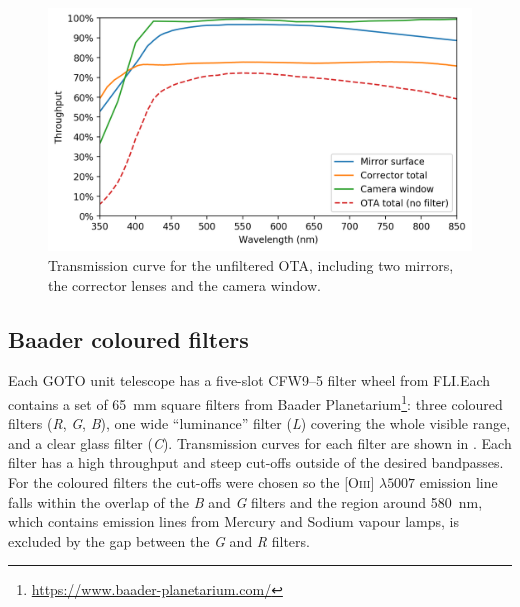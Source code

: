 \begin{colsection}
\begin{colsection}
\begin{figure}[t]
    \begin{center}
        \includegraphics[width=\textwidth]{images/throughput/trans_ota.png}
    \end{center}
    \caption[Combined OTA transmission curve]{
        Transmission curve for the unfiltered OTA, including two mirrors, the corrector lenses and the camera window.
    }\label{fig:trans_ota}
\end{figure}

\end{colsection}

\newpage
\subsection{Baader coloured filters}
\label{sec:filters}
\begin{colsection}

Each GOTO unit telescope has a five-slot CFW9--5 filter wheel from FLI.\@ Each contains a set of \SI{65}{\milli\metre} square filters from Baader Planetarium\footnote{\url{https://www.baader-planetarium.com/}}: three coloured filters (\textit{R}, \textit{G}, \textit{B}), one wide ``luminance'' filter (\textit{L}) covering the whole visible range, and a clear glass filter ({\textit{C}}). Transmission curves for each filter are shown in . Each filter has a high throughput and steep cut-offs outside of the desired bandpasses. For the coloured filters the cut-offs were chosen so the [O\textsc{iii}] $\lambda 5007$ emission line falls within the overlap of the \textit{B} and \textit{G} filters and the region around \SI{580}{\nano\metre}, which contains emission lines from Mercury and Sodium vapour lamps, is excluded by the gap between the \textit{G} and \textit{R} filters.


\end{colsection}
\end{colsection}
